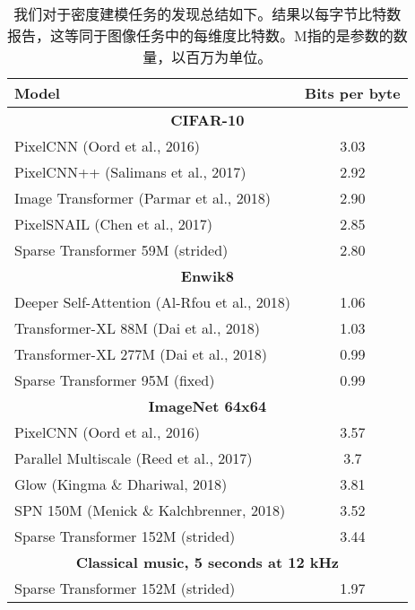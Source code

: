 \begin{table}[h]
\centering
\begin{tabular}{|l|c|}
\hline
\textbf{Model} & \textbf{Bits per byte} \\ \hline
\multicolumn{2}{|c|}{\textbf{CIFAR-10}} \\ \hline
PixelCNN (Oord et al., 2016) & 3.03 \\ \hline
PixelCNN++ (Salimans et al., 2017) & 2.92 \\ \hline
Image Transformer (Parmar et al., 2018) & 2.90 \\ \hline
PixelSNAIL (Chen et al., 2017) & 2.85 \\ \hline
Sparse Transformer 59M (strided) & 2.80 \\ \hline
\multicolumn{2}{|c|}{\textbf{Enwik8}} \\ \hline
Deeper Self-Attention (Al-Rfou et al., 2018) & 1.06 \\ \hline
Transformer-XL 88M (Dai et al., 2018) & 1.03 \\ \hline
Transformer-XL 277M (Dai et al., 2018) & 0.99 \\ \hline
Sparse Transformer 95M (fixed) & 0.99 \\ \hline
\multicolumn{2}{|c|}{\textbf{ImageNet 64x64}} \\ \hline
PixelCNN (Oord et al., 2016) & 3.57 \\ \hline
Parallel Multiscale (Reed et al., 2017) & 3.7 \\ \hline
Glow (Kingma \& Dhariwal, 2018) & 3.81 \\ \hline
SPN 150M (Menick \& Kalchbrenner, 2018) & 3.52 \\ \hline
Sparse Transformer 152M (strided) & 3.44 \\ \hline
\multicolumn{2}{|c|}{\textbf{Classical music, 5 seconds at 12 kHz}} \\ \hline
Sparse Transformer 152M (strided) & 1.97 \\ \hline
\end{tabular}
\caption{我们对于密度建模任务的发现总结如下。结果以每字节比特数报告，这等同于图像任务中的每维度比特数。M指的是参数的数量，以百万为单位。}
\label{tab:performance_comparison}
\end{table}

